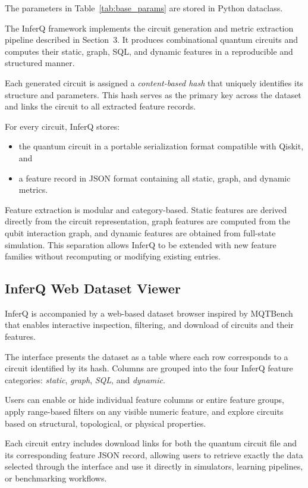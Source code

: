 \begin{appendices}
The parameters in Table~\ref{tab:base_params} are stored in Python dataclass. 

The InferQ framework implements the circuit generation and metric extraction pipeline described in Section~3. It produces combinational quantum circuits and computes their static, graph, SQL, and dynamic features in a reproducible and structured manner.

Each generated circuit is assigned a \emph{content-based hash} that uniquely identifies its structure and parameters. This hash serves as the primary key across the dataset and links the circuit to all extracted feature records.

For every circuit, InferQ stores:
\begin{itemize}
    \item the quantum circuit in a portable serialization format compatible with Qiskit, and
    \item a feature record in JSON format containing all static, graph, and dynamic metrics.
\end{itemize}

Feature extraction is modular and category-based. Static features are derived directly from the circuit representation, graph features are computed from the qubit interaction graph, and dynamic features are obtained from full-state simulation. This separation allows InferQ to be extended with new feature families without recomputing or modifying existing entries.

\subsection{InferQ Web Dataset Viewer}

InferQ is accompanied by a web-based dataset browser inspired by MQTBench\cite{Quetschlich_2023} that enables interactive inspection, filtering, and download of circuits and their features.

The interface presents the dataset as a table where each row corresponds to a circuit identified by its hash. Columns are grouped into the four InferQ feature categories: \textit{static}, \textit{graph}, \textit{SQL}, and \textit{dynamic}.

Users can enable or hide individual feature columns or entire feature groups, apply range-based filters on any visible numeric feature, and explore circuits based on structural, topological, or physical properties.

Each circuit entry includes download links for both the quantum circuit file and its corresponding feature JSON record, allowing users to retrieve exactly the data selected through the interface and use it directly in simulators, learning pipelines, or benchmarking workflows.




\end{appendices}
